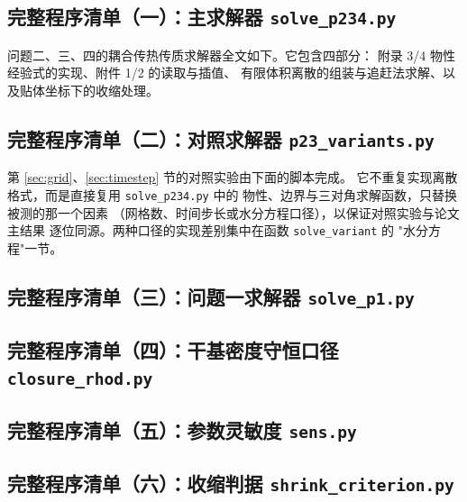\documentclass[12pt,a4paper,fontset=none]{ctexart}
\begin{document}
\subsection*{完整程序清单（一）：主求解器 \texttt{solve\_p234.py}}

问题二、三、四的耦合传热传质求解器全文如下。它包含四部分：
附录 3/4 物性经验式的实现、附件 1/2 的读取与插值、
有限体积离散的组装与追赶法求解、以及贴体坐标下的收缩处理。



\subsection*{完整程序清单（二）：对照求解器 \texttt{p23\_variants.py}}

第 \ref{sec:grid}、\ref{sec:timestep} 节的对照实验由下面的脚本完成。
它不重复实现离散格式，而是直接复用 \texttt{solve\_p234.py} 中的
物性、边界与三对角求解函数，只替换被测的那一个因素
（网格数、时间步长或水分方程口径），以保证对照实验与论文主结果
逐位同源。两种口径的实现差别集中在函数 \texttt{solve\_variant} 的
"水分方程"一节。



\subsection*{完整程序清单（三）：问题一求解器 \texttt{solve\_p1.py}}



\subsection*{完整程序清单（四）：干基密度守恒口径 \texttt{closure\_rhod.py}}



\subsection*{完整程序清单（五）：参数灵敏度 \texttt{sens.py}}



\subsection*{完整程序清单（六）：收缩判据 \texttt{shrink\_criterion.py}}
\end{document}
